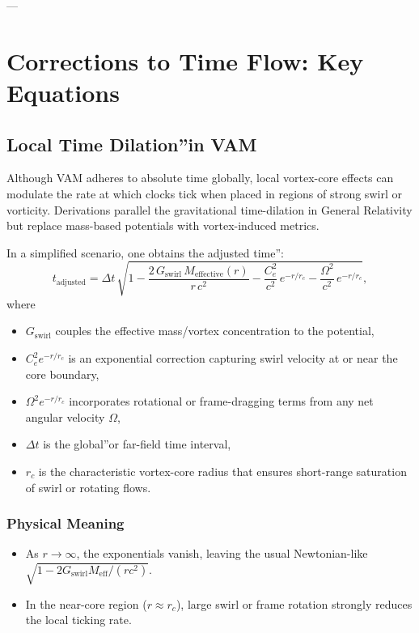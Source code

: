 \documentclass[a4paper,12pt]{article}
\begin{document}
---

\section{Corrections to Time Flow: Key Equations}

\subsection{Local Time \grqq Dilation\textquotedblright in VAM}
Although VAM adheres to absolute time globally, local vortex-core effects can modulate the rate at which clocks tick when placed in regions of strong swirl or vorticity. Derivations parallel the gravitational time-dilation in General Relativity but replace mass-based potentials with vortex-induced metrics.

In a simplified scenario, one obtains the \grqq adjusted time\textquotedblright:
\[
    t_\text{adjusted} =   \Delta t \,\sqrt{
        1 - \frac{2\,G_\text{swirl}\,M_\text{effective}(r)}{r\,c^2} - \frac{C_e^2}{c^2} \, e^{-r/r_c} - \frac{\Omega^2}{c^2} \, e^{-r/r_c}
    },
\]
where
\begin{itemize}
    \item \(G_\text{swirl}\) couples the effective mass/vortex concentration to the potential,
    \item \(C_e^2 e^{-r/r_c}\) is an exponential correction capturing swirl velocity at or near the core boundary,
    \item \(\Omega^2 e^{-r/r_c}\) incorporates rotational or frame-dragging terms from any net angular velocity \(\Omega\),
    \item \(\Delta t\) is the \grqq global\textquotedblright or far-field time interval,
    \item \(r_c\) is the characteristic vortex-core radius that ensures short-range saturation of swirl or rotating flows.
\end{itemize}

\subsubsection{Physical Meaning}
\begin{itemize}
    \item As \(r \to \infty\), the exponentials vanish, leaving the usual Newtonian-like \(\sqrt{1 - 2G_\text{swirl} M_\text{eff} / (rc^2)}\).
    \item In the near-core region (\(r \approx r_c\)), large swirl or frame rotation strongly reduces the local ticking rate.
\end{itemize}
\end{document}
